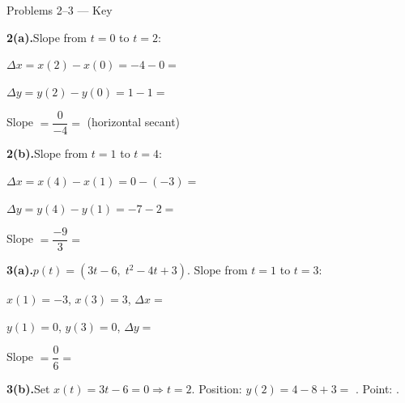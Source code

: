 \documentclass[10pt]{article}
\begin{document}
\begin{notesbox}{Problems 2--3 --- Key}

\textbf{2(a).}\quad Slope from $t = 0$ to $t = 2$:

$\Delta x = x(2) - x(0) = -4 - 0 = $ 

$\Delta y = y(2) - y(0) = 1 - 1 = $ 

Slope $= \dfrac{0}{-4} = $  (horizontal secant)

\vspace{6pt}
\textbf{2(b).}\quad Slope from $t = 1$ to $t = 4$:

$\Delta x = x(4) - x(1) = 0 - (-3) = $ 

$\Delta y = y(4) - y(1) = -7 - 2 = $ 

Slope $= \dfrac{-9}{3} = $ 

\vspace{0.10in}
\textbf{3(a).}\quad $p(t) = (3t - 6,\; t^2 - 4t + 3)$. Slope from $t = 1$ to $t = 3$:

$x(1) = -3$, $x(3) = 3$, $\Delta x = $ 

$y(1) = 0$, $y(3) = 0$, $\Delta y = $ 

Slope $= \dfrac{0}{6} = $ 

\vspace{6pt}
\textbf{3(b).}\quad Set $x(t) = 3t - 6 = 0 \Rightarrow t = 2$.
Position: $y(2) = 4 - 8 + 3 = $ . Point: .

\end{notesbox}

\vspace{0.08in}
\end{document}
